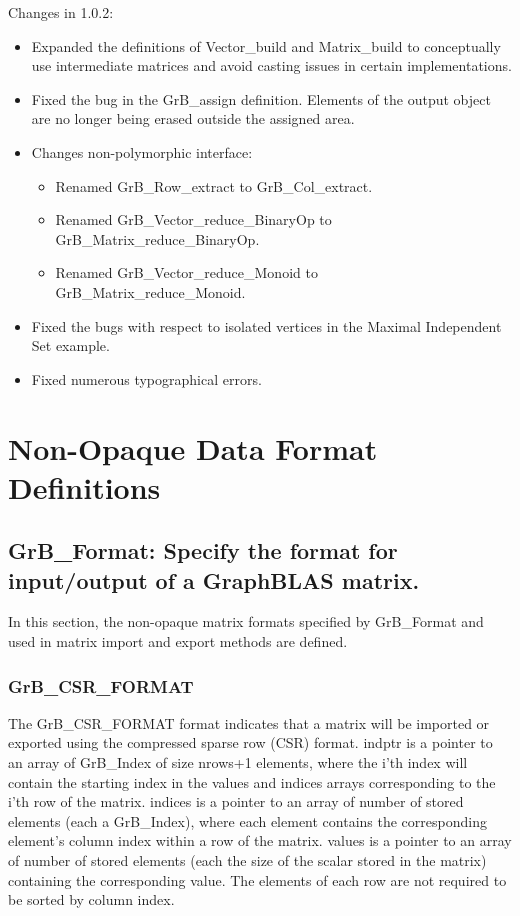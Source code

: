 Changes in 1.0.2:
\begin{itemize}
\item Expanded the definitions of {\sf Vector\_build} and {\sf Matrix\_build} to conceptually use intermediate matrices and avoid casting issues in certain implementations.
\item Fixed the bug in the {\sf GrB\_assign} definition. Elements of the output object are no longer being erased outside the assigned area.
\item Changes non-polymorphic interface:
    \begin{itemize}
    \item Renamed {\sf GrB\_Row\_extract} to {\sf GrB\_Col\_extract}.
    \item Renamed {\sf GrB\_Vector\_reduce\_BinaryOp} to {\sf GrB\_Matrix\_reduce\_BinaryOp}.
    \item Renamed {\sf GrB\_Vector\_reduce\_Monoid} to {\sf GrB\_Matrix\_reduce\_Monoid}.
    \end{itemize}
\item Fixed the bugs with respect to isolated vertices in the Maximal Independent Set example.
\item Fixed numerous typographical errors.
\end{itemize}


\chapter{Non-Opaque Data Format Definitions}
\label{Chp:GrB_Format}

\section{{\sf GrB\_Format}: Specify the format for input/output of a GraphBLAS matrix.}
\label{Sec:GrB_Format}

In this section, the non-opaque matrix formats specified by {\sf GrB\_Format} and used
in matrix import and export methods are defined.

\subsection{{\sf GrB\_CSR\_FORMAT}}

The {\sf GrB\_CSR\_FORMAT} format indicates that a matrix will be imported or
exported using the compressed sparse row (CSR) format.  {\sf indptr} is a 
pointer to an array of {\sf GrB\_Index} of size nrows+1 elements, where
the i'th index will contain the starting index in the {\sf values}
and {\sf indices} arrays corresponding to the i'th row of the matrix.
{\sf indices} is a pointer to an array of number of
stored elements (each a {\sf GrB\_Index}), where each element contains the 
corresponding element's column index within a row of the matrix.
{\sf values} is a pointer to an array of number of
stored elements (each the size of the scalar stored in the matrix) containing 
the corresponding value.  The 
elements of each row are not required to be sorted by column index.

